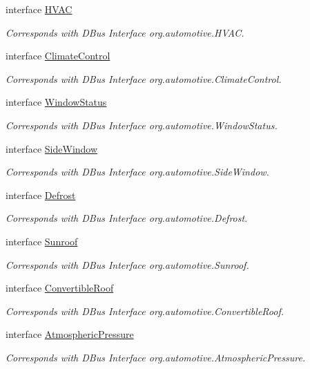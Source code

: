 \begin{DoxyCompactItemize}
interface \hyperlink{interfaceHVAC}{H\+V\+A\+C}
\begin{DoxyCompactList}\small\item\em Corresponds with D\+Bus Interface org.\+automotive.\+H\+V\+A\+C. \end{DoxyCompactList}\item 
interface \hyperlink{interfaceClimateControl}{Climate\+Control}
\begin{DoxyCompactList}\small\item\em Corresponds with D\+Bus Interface org.\+automotive.\+Climate\+Control. \end{DoxyCompactList}\item 
interface \hyperlink{interfaceWindowStatus}{Window\+Status}
\begin{DoxyCompactList}\small\item\em Corresponds with D\+Bus Interface org.\+automotive.\+Window\+Status. \end{DoxyCompactList}\item 
interface \hyperlink{interfaceSideWindow}{Side\+Window}
\begin{DoxyCompactList}\small\item\em Corresponds with D\+Bus Interface org.\+automotive.\+Side\+Window. \end{DoxyCompactList}\item 
interface \hyperlink{interfaceDefrost}{Defrost}
\begin{DoxyCompactList}\small\item\em Corresponds with D\+Bus Interface org.\+automotive.\+Defrost. \end{DoxyCompactList}\item 
interface \hyperlink{interfaceSunroof}{Sunroof}
\begin{DoxyCompactList}\small\item\em Corresponds with D\+Bus Interface org.\+automotive.\+Sunroof. \end{DoxyCompactList}\item 
interface \hyperlink{interfaceConvertibleRoof}{Convertible\+Roof}
\begin{DoxyCompactList}\small\item\em Corresponds with D\+Bus Interface org.\+automotive.\+Convertible\+Roof. \end{DoxyCompactList}\item 
interface \hyperlink{interfaceAtmosphericPressure}{Atmospheric\+Pressure}
\begin{DoxyCompactList}\small\item\em Corresponds with D\+Bus Interface org.\+automotive.\+Atmospheric\+Pressure. \end{DoxyCompactList}\item 

\end{DoxyCompactItemize}
